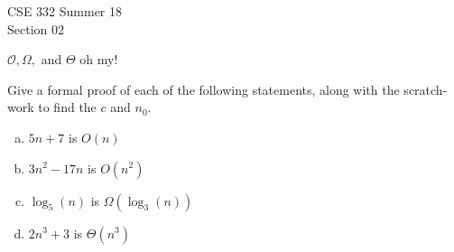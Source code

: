 \documentclass[12pt]{article}
\begin{document}
\vspace*{-2em}
{\large CSE 332 Summer 18\\
Section 02}
\vspace{-1em}
	
\begin{center}
	{\huge \color{purple} $\mathcal{O}, \Omega,$ and $\Theta$ oh my!}
\end{center}

Give a formal proof of each of the following statements, along with the scratch-work to find the $c$ and $n_0$. 

\begin{enumerate}[(a)]
	\item $5n+7$ is $O(n)$
		\vspace{1.1in}
	\item $3n^2 - 17n$ is $O(n^2)$
		\vspace{1.1in}
		
	\item $\log_5(n)$ is $\Omega(\log_3(n))$
\vspace{1.1in}
	\item $2n^3 + 3$ is $\Theta(n^3)$
	
\end{enumerate}
\end{document}
